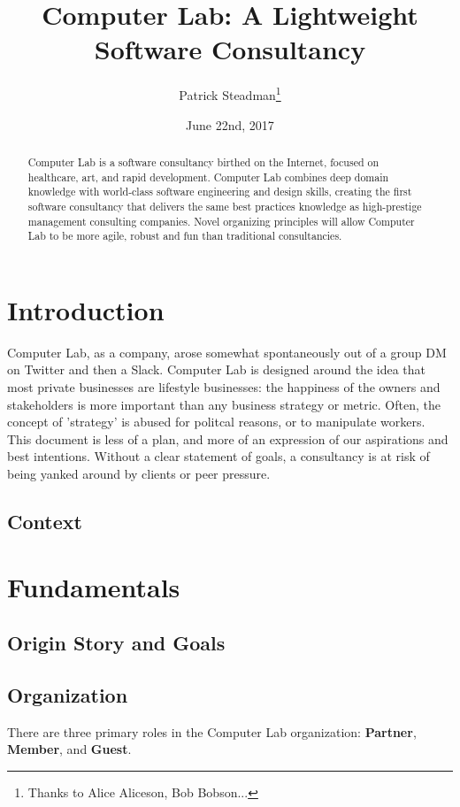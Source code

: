 \documentclass[12pt]{article}
\title{Computer Lab: A Lightweight Software Consultancy}
\author{Patrick Steadman\thanks{Thanks to Alice Aliceson, Bob Bobson...}}
\date{June 22nd, 2017}
\begin{document}
\maketitle

\begin{abstract}
Computer Lab is a software consultancy birthed on the Internet, focused on
healthcare, art, and rapid development. Computer Lab combines deep domain
knowledge with world-class software engineering and design skills, creating the
first software consultancy that delivers the same best practices knowledge as
high-prestige management consulting companies. Novel organizing principles will
allow Computer Lab to be more agile, robust and fun than traditional
consultancies.

\end{abstract}

\section{Introduction}

Computer Lab, as a company, arose somewhat spontaneously out of a group DM on
Twitter and then a Slack. Computer Lab is designed around the idea that most
private businesses are lifestyle businesses: the happiness of the owners and
stakeholders is more important than any business strategy or metric. Often, the
concept of 'strategy' is abused for politcal reasons, or to manipulate workers.
This document is less of a plan, and more of an expression of our aspirations
and best intentions. Without a clear statement of goals, a consultancy is at
risk of being yanked around by clients or peer pressure.

\subsection{Context}
\section{Fundamentals}
\subsection{Origin Story and Goals}
\subsection{Organization}

There are three primary roles in the Computer Lab organization: \textbf{Partner},
\textbf{Member}, and \textbf{Guest}.
\end{document}
